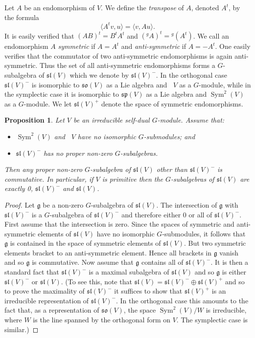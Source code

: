 \documentclass{amsart}
\newtheorem{proposition}[theorem]{Proposition}
\theoremstyle{definition}
\theoremstyle{remark}
\DeclareMathOperator{\Sym}{Sym}
\DeclareMathOperator{\bw}{{\bigwedge}^{\! 2}}
\let\mf\mathfrak
\begin{document}
Let $A$ be an endomorphism of $V$.  We define the \emph{transpose} of $A$, denoted $A^t$, by the formula
\begin{displaymath}
\langle A^t v, u \rangle=\langle v, Au \rangle.
\end{displaymath}
It is easily verified that $(AB)^t=B^t A^t$ and $({}^g A)^t={}^g (A^t)$.  We call an endomorphism $A$ \emph{symmetric}
if $A=A^t$ and \emph{anti-symmetric} if $A=-A^t$.  One easily verifies that the commutator of two anti-symmetric
endomorphisms is again anti-symmetric.  Thus the set of all anti-symmetric endomorphisms forms a $G$-subalgebra of
$\mf{sl}(V)$ which we denote by $\mf{sl}(V)^-$.  In the orthogonal case $\mf{sl}(V)^-$ is isomorphic to $\mf{so}(V)$ as
a Lie algebra and $\bw{V}$ as a $G$-module, while in the symplectic case it is isomorphic to $\mf{sp}(V)$ as a Lie
algebra and $\Sym^2(V)$ as a $G$-module.  We let $\mf{sl}(V)^+$ denote the space of symmetric endomorphisms.

\begin{proposition}
\label{prop:self-dual}
Let $V$ be an irreducible self-dual $G$-module.  Assume that:
\begin{itemize}
\item $\Sym^2(V)$ and $\bw{V}$ have no isomorphic $G$-submodules; and
\item $\mf{sl}(V)^-$ has no proper non-zero $G$-subalgebras.
\end{itemize}
Then any proper non-zero $G$-subalgebra of $\mf{sl}(V)$ other than $\mf{sl}(V)^-$ is commutative.  In particular, if
$V$ is primitive then the $G$-subalgebras of $\mf{sl}(V)$ are exactly 0, $\mf{sl}(V)^-$ and $\mf{sl}(V)$.
\end{proposition}

\begin{proof}
Let $\mf{g}$ be a non-zero $G$-subalgebra of $\mf{sl}(V)$.  The intersection of $\mf{g}$ with $\mf{sl}(V)^-$ is a
$G$-subalgebra of $\mf{sl}(V)^-$ and therefore either 0 or all of $\mf{sl}(V)^-$.  First assume that the intersection
is zero.  Since the spaces of symmetric and anti-symmetric elements of $\mf{sl}(V)$ have no isomorphic $G$-submodules,
it follows that $\mf{g}$ is contained in the space of symmetric elements of $\mf{sl}(V)$.  But two symmetric elements
bracket to an anti-symmetric element.  Hence all brackets in $\mf{g}$ vanish and so $\mf{g}$ is commutative.  Now
assume that $\mf{g}$ contains all of $\mf{sl}(V)^-$.  It is then a standard fact that $\mf{sl}(V)^-$ is a maximal
subalgebra of $\mf{sl}(V)$ and so $\mf{g}$ is either $\mf{sl}(V)^-$ or $\mf{sl}(V)$.  (To see this, note that
$\mf{sl}(V)=\mf{sl}(V)^- \oplus \mf{sl}(V)^+$ and so to prove the maximality of $\mf{sl}(V)^-$ it suffices to show that
$\mf{sl}(V)^+$ is an irreducible representation of $\mf{sl}(V)^-$.  In the orthogonal case this amounts to the fact
that, as a representation of $\mf{so}(V)$, the space $\Sym^2(V)/W$ is irreducible, where $W$ is the line spanned by the
orthogonal form on $V$.  The symplectic case is similar.)
\end{proof}
\end{document}
